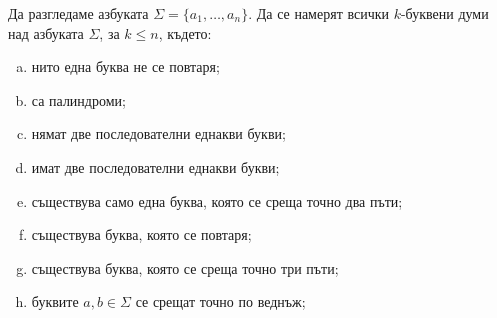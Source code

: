 \begin{problem}
  Да разгледаме азбуката $\Sigma = \{a_1,\dots,a_n\}$.
  Да се намерят всички $k$-буквени думи над азбуката $\Sigma$, за $k \leq n$, където:
  \begin{enumerate}[a)]
  \item
    нито една буква не се повтаря;
  \item
    са палиндроми;
  \item
    нямат две последователни еднакви букви;
  \item
    имат две последователни еднакви букви;
  \item
    съществува само една буква, която се среща точно два пъти;
  \item
    съществува буква, която се повтаря;
  \item
    съществува буква, която се среща точно три пъти;
  \item
    буквите $a, b\in \Sigma$ се срещат точно по веднъж;
  \end{enumerate}
\end{problem}




